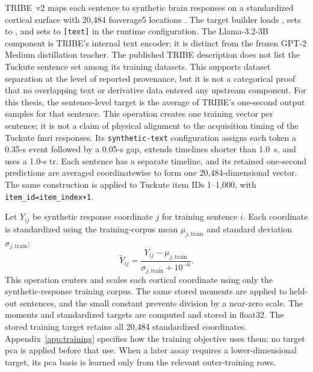 TRIBE~v2 maps each sentence to synthetic brain responses on a standardized cortical surface with 20,484 fsaverage5 locations \autocite{dascoli2026}.
The target builder loads , sets  to , and sets  to \texttt{[text]} in the runtime configuration. 
The Llama-3.2-3B component is TRIBE's internal text encoder; it is distinct from the frozen GPT-2 Medium distillation teacher. 
The published TRIBE description does not list the Tuckute sentence set among its training datasets. This supports dataset separation at the level of reported provenance, but it is not a categorical proof that no overlapping text or derivative data entered any upstream component.\autocite{dascoli2026}
For this thesis, the sentence-level target is the average of TRIBE's one-second output samples for that sentence.
This operation creates one training vector per sentence; it is not a claim of physical alignment to the acquisition timing of the Tuckute \ac{fmri} responses.
Its \texttt{synthetic-text} configuration assigns each token a 0.35-s event followed by a 0.05-s gap, extends timelines shorter than 1.0~s, and uses a 1.0-s \ac{tr}. 
Each sentence has a separate timeline, and its retained one-second predictions are averaged coordinatewise to form one 20,484-dimensional vector.
The same construction is applied to Tuckute item IDs 1--1,000, with \texttt{item\_id=item\_index+1}. 

Let $Y_{ij}$ be synthetic response coordinate $j$ for training sentence $i$.
Each coordinate is standardized using the training-corpus mean $\mu_{j,\mathrm{train}}$ and standard deviation $\sigma_{j,\mathrm{train}}$:
\[
  \widetilde{Y}_{ij}
  =
  \frac{Y_{ij}-\mu_{j,\mathrm{train}}}
       {\sigma_{j,\mathrm{train}}+10^{-6}}.
\]
This operation centers and scales each cortical coordinate using only the synthetic-response training corpus.
The same stored moments are applied to held-out sentences, and the small constant prevents division by a near-zero scale.
The moments and standardized targets are computed and stored in float32.
The stored training target retains all 20,484 standardized coordinates.
Appendix~\ref{app:training} specifies how the training objective uses them; no target \ac{pca} is applied before that use.
When a later assay requires a lower-dimensional target, its \ac{pca} basis is learned only from the relevant outer-training rows. 

